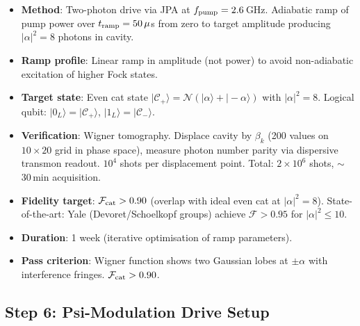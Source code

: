 \documentclass[11pt]{article}
\theoremstyle{definition}
\theoremstyle{remark}
\newcommand{\ee}[1]{\times 10^{#1}}
\begin{document}
\begin{itemize}[nosep]
\item \textbf{Method}: Two-photon drive via JPA at $f_{\rm pump} = 2.6$\,GHz.
  Adiabatic ramp of pump power over $t_{\rm ramp} = 50\,\mu$s from zero
  to target amplitude producing $|\alpha|^2 = 8$ photons in cavity.
\item \textbf{Ramp profile}: Linear ramp in amplitude (not power) to
  avoid non-adiabatic excitation of higher Fock states.
\item \textbf{Target state}: Even cat state
  $|\mathcal{C}_+\rangle = \mathcal{N}(|\alpha\rangle + |-\alpha\rangle)$
  with $|\alpha|^2 = 8$. Logical qubit: $|0_L\rangle = |\mathcal{C}_+\rangle$,
  $|1_L\rangle = |\mathcal{C}_-\rangle$.
\item \textbf{Verification}: Wigner tomography. Displace cavity by
  $\beta_k$ (200 values on $10 \times 20$ grid in phase space), measure
  photon number parity via dispersive transmon readout. $10^4$ shots per
  displacement point. Total: $2\ee{6}$ shots, $\sim$30\,min acquisition.
\item \textbf{Fidelity target}: $\mathcal{F}_{\rm cat} > 0.90$ (overlap
  with ideal even cat at $|\alpha|^2 = 8$). State-of-the-art: Yale
  (Devoret/Schoelkopf groups) achieve $\mathcal{F} > 0.95$ for
  $|\alpha|^2 \leq 10$.
\item \textbf{Duration}: 1 week (iterative optimisation of ramp
  parameters).
\item \textbf{Pass criterion}: Wigner function shows two Gaussian lobes
  at $\pm\alpha$ with interference fringes. $\mathcal{F}_{\rm cat} > 0.90$.
\end{itemize}

\subsection{Step 6: Psi-Modulation Drive Setup}
\end{document}
